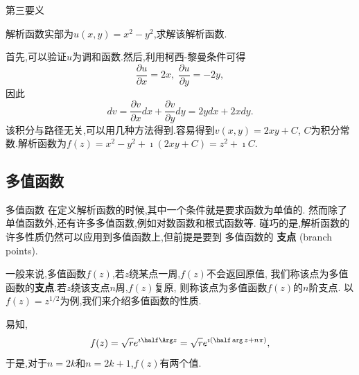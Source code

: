 \documentclass[fontset=windows, chinese, 10pt]{beamer}
\begin{document}
\begin{frame}{第三要义}
\begin{example}
解析函数实部为$u(x,y) = x^2 - y^2$,求解该解析函数.
\end{example}
\begin{solution}
首先,可以验证$u$为调和函数.然后,利用柯西-黎曼条件可得
\begin{equation}
    \frac{\partial u}{\partial x } = 2x, \; \frac{\partial u}{\partial y } = -2y  ,
\end{equation}
因此
\begin{equation}
    d v = \frac{\partial v}{\partial x } dx + \frac{\partial v}{\partial y } dy = 2y dx + 2x dy .
\end{equation}
该积分与路径无关,可以用几种方法得到.容易得到$v(x,y) = 2xy + C$, $C$为积分常数.解析函数为$f(z)=x^2 - y^2 + \imath (2x y + C) = z^2 + \imath C$.
\end{solution}
\end{frame}

\subsection{多值函数}

\begin{frame}{多值函数}
在定义解析函数的时候,其中一个条件就是要求函数为单值的.
然而除了单值函数外,还有许多多值函数,例如对数函数和根式函数等.
碰巧的是,解析函数的许多性质仍然可以应用到多值函数上,但前提是要到
多值函数的 \textbf{支点} (branch points).

一般来说,多值函数$f(z)$,若$z$绕某点一周,$f(z)$不会返回原值,
我们称该点为多值函数的\textbf{支点}.若$z$绕该支点$n$周,$f(z)$复原,
则称该点为多值函数$f(z)$的$n$阶支点.
以$f(z) = z^{1/2}$为例,我们来介绍多值函数的性质.

易知,\[
    f(z) = \sqrt{r} e^{\imath \half  \Arg z}
    =  \sqrt{r} e^{\imath \left( \half \arg z + n \pi \right)},
    \]
于是,对于$n= 2k$和$n=2k+1$,$f(z)$有两个值.
\end{frame}
\end{document}
